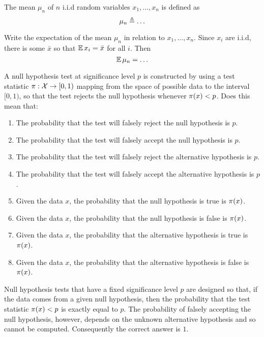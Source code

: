 \documentclass[a4paper]{article}
\begin{document}
\begin{exercise}
  The mean $\mu_n$ of $n$  i.i.d random variables $x_1, \ldots, x_n$ is defined as
  \[
  \mu_n \defn
  \ifdefined \solution
  \frac{1}{n} \sum_{i=1}^n x_i
  \else
  \ldots 
  \fi
  \]
\end{exercise}

\begin{exercise}
  Write the expectation of the mean $\mu_n$ in relation to $x_1, \ldots, x_n$.
  \ifdefined \solution
  Since $x_i$ are i.i.d, there is some $\bar{x}$ so that $\mathop{\mbox{\ensuremath{\mathbb{E}}}}\nolimits x_i = \bar{x}$ for all $i$. Then
  \fi
  \[
  \E \mu_n =
  \ifdefined \solution
  \E \frac{1}{n} \sum_{i=1}^n x_i
  = \frac{1}{n} \sum_{i=1}^n \E x_i = \bar{x}
  \else
  \ldots
  \fi
  \]

\end{exercise}

\begin{exercise}
  A null hypothesis test at significance level $p$ is constructed by using a test statistic $\pi: {\mathcal{X}} \to [0,1)$ mapping from the space of possible data to the interval $[0,1)$, so that the test rejects the null hypothesis whenever $\pi(x) < p$. Does this mean that:
  \begin{enumerate}
  \item The probability that the test will falsely reject the null hypothesis is $p$.
  \item The probability that the test will falsely accept the null hypothesis is $p$.
  \item The probability that the test will falsely reject the alternative hypothesis is $p$.
  \item The probability that the test will falsely accept the alternative hypothesis is $p$.
  \item Given the data $x$, the probability that the null hypothesis is true is $\pi(x)$.
  \item Given the data $x$, the probability that the null hypothesis is false is $\pi(x)$.
  \item Given the data $x$, the probability that the alternative hypothesis is true is $\pi(x)$.
  \item Given the data $x$, the probability that the alternative hypothesis is false is $\pi(x)$.
  \end{enumerate}
  \end{exercise}
  \ifdefined \solution
  Null hypothesis tests that have a fixed significance level $p$ are designed so that, if the data comes from a given null hypothesis, then the probability that the test statistic $\pi(x) < p$ is exactly equal to $p$. The probability of falsely accepting the null hypothesis, however, depends on the unknown alternative hypothesis and so cannot be computed. Consequently the correct answer is $1$.
  \fi
\end{document}
